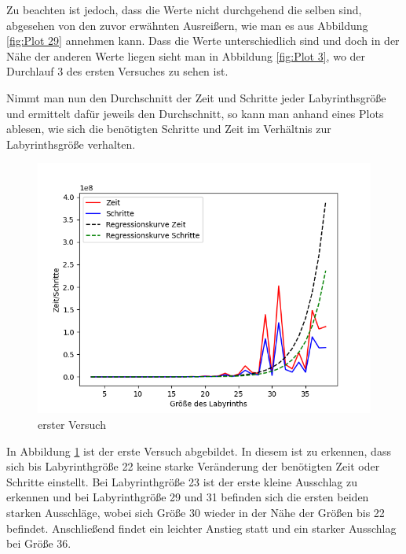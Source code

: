 \documentclass[12pt, a4paper, titlepage]{article}
\begin{document}
Zu beachten ist jedoch, dass die Werte nicht durchgehend die selben sind, abgesehen von den zuvor erwähnten Ausreißern, wie man es aus Abbildung \ref{fig:Plot 29} annehmen kann.
Dass die Werte unterschiedlich sind und doch in der Nähe der anderen Werte liegen sieht man in Abbildung \ref{fig:Plot 3}, wo der Durchlauf 3 des ersten Versuches zu sehen ist.

Nimmt man nun den Durchschnitt der Zeit und Schritte jeder Labyrinthsgröße und ermittelt dafür jeweils den Durchschnitt, so kann man anhand eines Plots ablesen, wie sich die benötigten Schritte und Zeit im Verhältnis zur Labyrinthsgröße verhalten.

\begin{figure}[h]
	\centering
	\includegraphics[scale=.5]{v1Aus.png}
	\caption{erster Versuch}
	\label{fig:Plot v1}
\end{figure}
 
In Abbildung \ref{fig:Plot v1} ist der erste Versuch abgebildet.
In diesem ist zu erkennen, dass sich bis Labyrinthgröße 22 keine starke Veränderung der benötigten Zeit oder Schritte einstellt.
Bei Labyrinthgröße 23 ist der erste kleine Ausschlag zu erkennen und bei Labyrinthgröße 29 und 31 befinden sich die ersten beiden starken Ausschläge, wobei sich Größe 30 wieder in der Nähe der Größen bis 22 befindet.
Anschließend findet ein leichter Anstieg statt und ein starker Ausschlag bei Größe 36.
\end{document}

